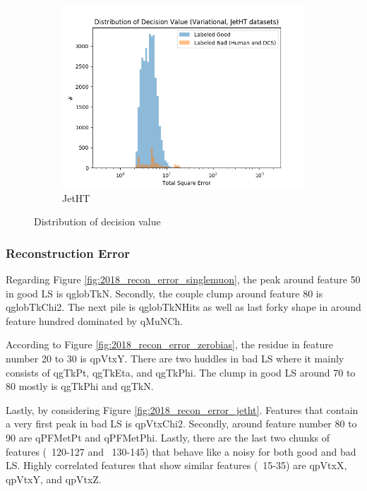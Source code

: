 \begin{figure}[h!]
\begin{subfigure}[b]{0.49\linewidth}
        \includegraphics[width=\linewidth]{images/reco/2018/feature_2/se_dist_Variational1f2_JetHT_unlog.png}
        \caption{JetHT}
    \end{subfigure}
    \caption{Distribution of decision value}
\label{fig:2018_f2_se_dist}
\end{figure}

\subsubsection{Reconstruction Error}
Regarding Figure \ref{fig:2018_recon_error_singlemuon}, the peak around feature 50 in good LS is qglobTkN. Secondly, the couple clump around feature 80 is qglobTkChi2. The next pile is qglobTkNHits as well as last forky shape in around feature hundred dominated by qMuNCh. 

According to Figure \ref{fig:2018_recon_error_zerobias}, the residue in feature number 20 to 30 is qpVtxY. There are two huddles in bad LS where it mainly consists of qgTkPt, qgTkEta, and qgTkPhi. The clump in good LS around 70 to 80 mostly is qgTkPhi and qgTkN.

Lastly, by considering Figure \ref{fig:2018_recon_error_jetht}. Features that contain a very first peak in bad LS is qpVtxChi2. Secondly, around feature number 80 to 90 are qPFMetPt and qPFMetPhi. Lastly, there are the last two chunks of features (~120-127 and ~130-145) that behave like a noisy for both good and bad LS. Highly correlated features that show similar features (~15-35) are qpVtxX, qpVtxY, and qpVtxZ.

